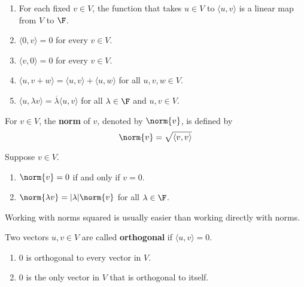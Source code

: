 \documentclass{extarticle}
\begin{document}
\begin{corollary}
    \begin{enumerate}[label=(\alph*)]
        \item For each fixed \(v \in V\), the function that takes \(u \in V\) to 
        \(\langle u,v \rangle\) is a linear map from \(V\) to \(\F\).
        \item \(\langle 0,v \rangle = 0\) for every \(v \in V\). 
        \item \(\langle v,0 \rangle = 0\) for every \(v \in V\). 
        \item \(\langle u,v + w \rangle = \langle u,v \rangle + \langle u,w \rangle\) 
        for all \(u, v, w \in V\).
        \item \(\langle u,\lambda v \rangle = \overline{\lambda} \langle u,v \rangle\)
        for all \(\lambda \in \F\) and \(u, v \in V\).
    \end{enumerate}
\end{corollary}

\begin{definition}
    For \(v \in V\), the \textbf{norm} of \(v\), denoted by \(\norm{v}\), is defined by 
    \[\norm{v} = \sqrt{\langle v,v \rangle}\]
\end{definition}

\begin{corollary}
    Suppose \(v \in V\). 
    \begin{enumerate}[label=(\alph*)]
        \item \(\norm{v} = 0\) if and only if \(v = 0\). 
        \item \(\norm{\lambda v} = |\lambda| \norm{v}\) for all \(\lambda \in \F\).
    \end{enumerate}
\end{corollary}

\begin{remark}
    Working with norms squared is usually easier than working directly with norms. 
\end{remark}

\begin{definition}[orthogonal]
    Two vectors \(u, v \in V\) are called \textbf{orthogonal} if \(\langle u,v \rangle = 0\).
\end{definition}

\begin{corollary}
    \begin{enumerate}[label=(\alph*)]
        \item 0 is orthogonal to every vector in \(V\). 
        \item 0 is the only vector in \(V\) that is orthogonal to itself.
    \end{enumerate}
\end{corollary}
\end{document}
